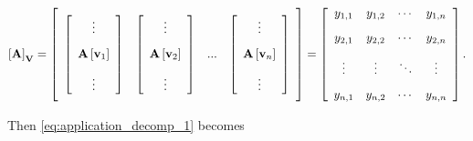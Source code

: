 \begin{equation} \left[\raisebox{0mm}[1mm][1mm]{} \mathbf{A}\right]_\mathbf{V} =  \left[\raisebox{15mm}{} \begin{array}{cccc} \left[\begin{array}{c} \vdots \\[3mm] \mathbf{A}\left[\mathbf{v}_1\right] \\[3mm] \vdots \end{array}\right] & \left[\begin{array}{c} \vdots \\[3mm] \mathbf{A}\left[\mathbf{v}_2\right] \\[3mm] \vdots \end{array}\right] & ... & \left[\begin{array}{c} \vdots \\[3mm] \mathbf{A}\left[\mathbf{v}_n\right] \\[3mm] \vdots \end{array}\right] \end{array}\right] = \left[\begin{array}{cccc} y_{1,1} & y_{1,2} & \cdots & y_{1,n} \\[3mm] y_{2,1} & y_{2,2} & \cdots & y_{2,n} \\[3mm] \vdots & \vdots & \ddots & \vdots \\[3mm] y_{n,1} & y_{n,2} & \cdots & y_{n,n}\end{array}\right]. \label{eq:application_decomp_3}\end{equation}

	Then \eqref{eq:application_decomp_1} becomes

